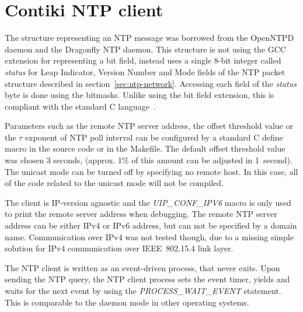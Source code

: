 
\section{Contiki NTP client}
The structure representing an NTP message was borrowed from the OpenNTPD daemon
and the Dragonfly NTP daemon. %
This structure is not using the GCC extension for representing a bit field,
instead uses a single 8-bit integer called {\it{status}}
for Leap Indicator, Version Number and Mode fields of the NTP packet
structure described in section~\ref{sec:ntp-network}.
Accessing each field of the {\it{status}} byte is done using the bitmasks.
Unlike using the bit field extension,
this is compliant with the standard C language~\cite{c99}.

Parameters such as the remote NTP server address, the offset threshold value
or the $\tau$ exponent of NTP poll interval can be configured by a standard C define macro
in the source code or in the Makefile.
The default offset threshold value was chosen 3 seconds,
(approx. 1\% of this amount can be adjusted in 1~second).
The unicast mode can be turned off by specifying no remote host.
In this case, all of the code related to the unicast mode will not be compiled.

The client is IP-version agnostic and the {\it{UIP\_CONF\_IPV6}} macro is only used
to print the remote server address when debugging.
The remote NTP server address can be either IPv4 or IPv6 address,
but can not be specified by a domain name.
Communication over IPv4 was not tested though, due to a missing simple solution for
IPv4 communication over IEEE~802.15.4 link layer. %

The NTP client is written as an event-driven process, that never exits.
Upon sending the NTP query, the NTP client process sets the event timer,
yields and waits for the next event by using the {\it{PROCESS\_WAIT\_EVENT}} statement.
This is comparable to the daemon mode in other operating systems.

